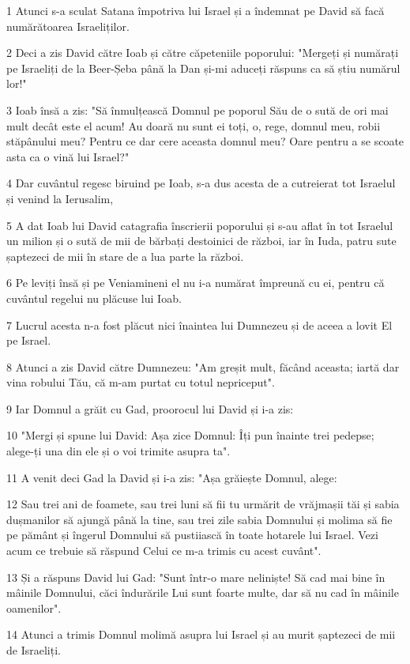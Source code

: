 \par 1 Atunci s-a sculat Satana împotriva lui Israel și a îndemnat pe David să facă numărătoarea Israeliților.
\par 2 Deci a zis David către Ioab și către căpeteniile poporului: "Mergeți și numărați pe Israeliți de la Beer-Șeba până la Dan și-mi aduceți răspuns ca să știu numărul lor!"
\par 3 Ioab însă a zis: "Să înmulțească Domnul pe poporul Său de o sută de ori mai mult decât este el acum! Au doară nu sunt ei toți, o, rege, domnul meu, robii stăpânului meu? Pentru ce dar cere aceasta domnul meu? Oare pentru a se scoate asta ca o vină lui Israel?"
\par 4 Dar cuvântul regesc biruind pe Ioab, s-a dus acesta de a cutreierat tot Israelul și venind la Ierusalim,
\par 5 A dat Ioab lui David catagrafia înscrierii poporului și s-au aflat în tot Israelul un milion și o sută de mii de bărbați destoinici de război, iar în Iuda, patru sute șaptezeci de mii în stare de a lua parte la război.
\par 6 Pe leviți însă și pe Veniamineni el nu i-a numărat împreună cu ei, pentru că cuvântul regelui nu plăcuse lui Ioab.
\par 7 Lucrul acesta n-a fost plăcut nici înaintea lui Dumnezeu și de aceea a lovit El pe Israel.
\par 8 Atunci a zis David către Dumnezeu: "Am greșit mult, făcând aceasta; iartă dar vina robului Tău, că m-am purtat cu totul nepriceput".
\par 9 Iar Domnul a grăit cu Gad, proorocul lui David și i-a zis:
\par 10 "Mergi și spune lui David: Așa zice Domnul: Îți pun înainte trei pedepse; alege-ți una din ele și o voi trimite asupra ta".
\par 11 A venit deci Gad la David și i-a zis: "Așa grăiește Domnul, alege:
\par 12 Sau trei ani de foamete, sau trei luni să fii tu urmărit de vrăjmașii tăi și sabia dușmanilor să ajungă până la tine, sau trei zile sabia Domnului și molima să fie pe pământ și îngerul Domnului să pustiiască în toate hotarele lui Israel. Vezi acum ce trebuie să răspund Celui ce m-a trimis cu acest cuvânt".
\par 13 Și a răspuns David lui Gad: "Sunt într-o mare neliniște! Să cad mai bine în mâinile Domnului, căci îndurările Lui sunt foarte multe, dar să nu cad în mâinile oamenilor".
\par 14 Atunci a trimis Domnul molimă asupra lui Israel și au murit șaptezeci de mii de Israeliți.
